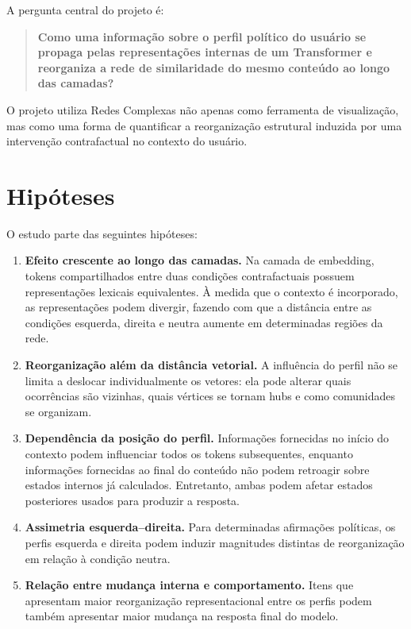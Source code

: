 \documentclass[11pt,a4paper]{article}
\begin{document}
A pergunta central do projeto é:

\begin{quote}
\textbf{Como uma informação sobre o perfil político do usuário se propaga pelas representações internas de um Transformer e reorganiza a rede de similaridade do mesmo conteúdo ao longo das camadas?}
\end{quote}

O projeto utiliza Redes Complexas não apenas como ferramenta de visualização, mas como uma forma de quantificar a reorganização estrutural induzida por uma intervenção contrafactual no contexto do usuário.

\section{Hipóteses}

O estudo parte das seguintes hipóteses:

\begin{enumerate}[label=H\arabic*.]
    \item \textbf{Efeito crescente ao longo das camadas.} Na camada de embedding, tokens compartilhados entre duas condições contrafactuais possuem representações lexicais equivalentes. À medida que o contexto é incorporado, as representações podem divergir, fazendo com que a distância entre as condições esquerda, direita e neutra aumente em determinadas regiões da rede.

    \item \textbf{Reorganização além da distância vetorial.} A influência do perfil não se limita a deslocar individualmente os vetores: ela pode alterar quais ocorrências são vizinhas, quais vértices se tornam hubs e como comunidades se organizam.

    \item \textbf{Dependência da posição do perfil.} Informações fornecidas no início do contexto podem influenciar todos os tokens subsequentes, enquanto informações fornecidas ao final do conteúdo não podem retroagir sobre estados internos já calculados. Entretanto, ambas podem afetar estados posteriores usados para produzir a resposta.

    \item \textbf{Assimetria esquerda--direita.} Para determinadas afirmações políticas, os perfis esquerda e direita podem induzir magnitudes distintas de reorganização em relação à condição neutra.

    \item \textbf{Relação entre mudança interna e comportamento.} Itens que apresentam maior reorganização representacional entre os perfis podem também apresentar maior mudança na resposta final do modelo.
\end{enumerate}
\end{document}
